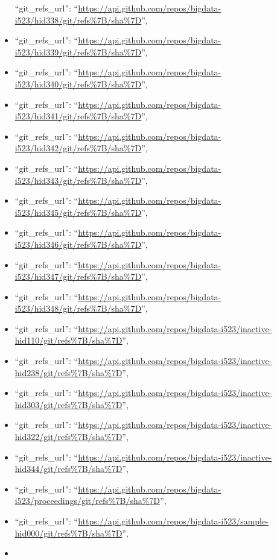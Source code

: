 \begin{itemize}
  ``git\_refs\_url'':
  ``\url{https://api.github.com/repos/bigdata-i523/hid338/git/refs\%7B/sha\%7D}'',
\item
  ``git\_refs\_url'':
  ``\url{https://api.github.com/repos/bigdata-i523/hid339/git/refs\%7B/sha\%7D}'',
\item
  ``git\_refs\_url'':
  ``\url{https://api.github.com/repos/bigdata-i523/hid340/git/refs\%7B/sha\%7D}'',
\item
  ``git\_refs\_url'':
  ``\url{https://api.github.com/repos/bigdata-i523/hid341/git/refs\%7B/sha\%7D}'',
\item
  ``git\_refs\_url'':
  ``\url{https://api.github.com/repos/bigdata-i523/hid342/git/refs\%7B/sha\%7D}'',
\item
  ``git\_refs\_url'':
  ``\url{https://api.github.com/repos/bigdata-i523/hid343/git/refs\%7B/sha\%7D}'',
\item
  ``git\_refs\_url'':
  ``\url{https://api.github.com/repos/bigdata-i523/hid345/git/refs\%7B/sha\%7D}'',
\item
  ``git\_refs\_url'':
  ``\url{https://api.github.com/repos/bigdata-i523/hid346/git/refs\%7B/sha\%7D}'',
\item
  ``git\_refs\_url'':
  ``\url{https://api.github.com/repos/bigdata-i523/hid347/git/refs\%7B/sha\%7D}'',
\item
  ``git\_refs\_url'':
  ``\url{https://api.github.com/repos/bigdata-i523/hid348/git/refs\%7B/sha\%7D}'',
\item
  ``git\_refs\_url'':
  ``\url{https://api.github.com/repos/bigdata-i523/inactive-hid110/git/refs\%7B/sha\%7D}'',
\item
  ``git\_refs\_url'':
  ``\url{https://api.github.com/repos/bigdata-i523/inactive-hid238/git/refs\%7B/sha\%7D}'',
\item
  ``git\_refs\_url'':
  ``\url{https://api.github.com/repos/bigdata-i523/inactive-hid303/git/refs\%7B/sha\%7D}'',
\item
  ``git\_refs\_url'':
  ``\url{https://api.github.com/repos/bigdata-i523/inactive-hid322/git/refs\%7B/sha\%7D}'',
\item
  ``git\_refs\_url'':
  ``\url{https://api.github.com/repos/bigdata-i523/inactive-hid344/git/refs\%7B/sha\%7D}'',
\item
  ``git\_refs\_url'':
  ``\url{https://api.github.com/repos/bigdata-i523/proceedings/git/refs\%7B/sha\%7D}'',
\item
  ``git\_refs\_url'':
  ``\url{https://api.github.com/repos/bigdata-i523/sample-hid000/git/refs\%7B/sha\%7D}'',
\item

\end{itemize}

